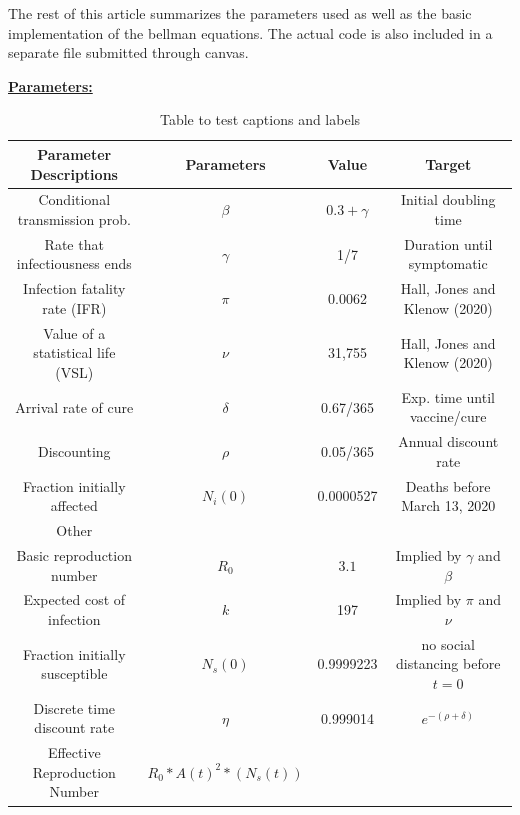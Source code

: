 \documentclass[12pt]{article}
\begin{document}
The rest of this article summarizes the parameters used as well as the basic implementation of the bellman equations. The actual code is also included in a separate file submitted through canvas.


\newpage
{\bf \underline{Parameters:}}
\begin{table}[h!]
	\centering
	\begin{tabular}{||c c c c||} 
		\hline
		Parameter Descriptions 		& Parameters & Value & Target \\ [0.5ex] 
		\hline\hline
		Conditional transmission prob. 		& $\beta$ 	& $0.3 + \gamma$& Initial doubling time \\ 
		Rate that infectiousness ends 		& $\gamma$ 	& 1/7 		& Duration until symptomatic \\
		Infection fatality rate (IFR) 		& $\pi$ 	& 0.0062 	& Hall, Jones and Klenow (2020) \\
		Value of a statistical life (VSL) 	& $\nu$ 	& 31,755	& Hall, Jones and Klenow (2020) \\
		Arrival rate of cure 			& $\delta$ 	& 0.67/365 	& Exp. time until vaccine/cure \\
		Discounting 				& $\rho$ 	& 0.05/365	& Annual discount rate \\
		Fraction initially affected 		& $N_i(0)$ 	& 0.0000527 	& Deaths before March 13, 2020 \\ [1ex] 

		\hline \hline
		Other & & & \\ [0.5ex] 
		\hline\hline
		Basic reproduction number 		& $R_0$ 	& $3.1$ & Implied by $\gamma$ and $\beta$ \\ 
		Expected cost of infection 		& $k$ 	& 197 		& Implied by $\pi$ and $\nu$ \\
		Fraction initially susceptible 		& $N_s(0)$ 	& 0.9999223 	& no social distancing before $t=0$ \\
		Discrete time discount rate 		& $\eta$ 	& 0.999014 	& $e^{-(\rho + \delta)}$ \\  %
		Effective Reproduction Number 		& $R_0*A(t)^2*(N_s(t))$ 	&  	& \\[1ex]
		\hline
	\end{tabular}
	\caption{Table to test captions and labels}
	\label{table:parameters}
\end{table}
\end{document}
